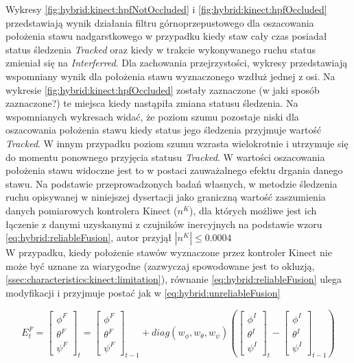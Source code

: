 Wykresy \ref{fig:hybrid:kinect:hpfNotOccluded} i \ref{fig:hybrid:kinect:hpfOccluded} przedstawiają wynik działania filtru górnoprzepustowego dla oszacowania położenia stawu nadgarstkowego w przypadku kiedy staw cały czas posiadał status śledzenia \emph{Tracked} oraz kiedy w trakcie wykonywanego ruchu status zmieniał się na \emph{Interferred}. Dla zachowania przejrzystości, wykresy przedstawiają wspomniany wynik dla położenia stawu wyznaczonego wzdłuż jednej z osi. Na wykresie \ref{fig:hybrid:kinect:hpfOccluded} zostały zaznaczone (w jaki sposób zaznaczone?) te miejsca kiedy nastąpiła zmiana statusu śledzenia. Na wspomnianych wykresach widać, że poziom szumu pozostaje niski dla oszacowania położenia stawu kiedy status jego śledzenia przyjmuje wartość \emph{Tracked}. W innym przypadku poziom szumu wzrasta wielokrotnie i utrzymuje się do momentu ponownego przyjęcia statusu  \emph{Tracked}. W wartości oszacowania położenia stawu widoczne jest to w postaci zauważalnego efektu drgania danego stawu. Na podstawie przeprowadzonych badań własnych, w metodzie śledzenia ruchu opisywanej w niniejszej dysertacji jako graniczną wartość zaszumienia danych pomiarowych kontrolera Kinect ($n^K$), dla których możliwe jest ich łączenie z danymi uzyskanymi z czujników inercyjnych na podstawie wzoru \eqref{eq:hybrid:reliableFusion}, autor przyjął $|n^K| \le 0.0004$\\

W przypadku, kiedy położenie stawów wyznaczone przez kontroler Kinect nie może być uznane za wiarygodne (zazwyczaj spowodowane jest to okluzją, \ref{ssec:characteristics:kinect:limitation}), równanie \eqref{eq:hybrid:reliableFusion} ulega modyfikacji i przyjmuje postać jak w \eqref{eq:hybrid:unreliableFusion} 

\begin{equation} 
	\label{eq:hybrid:unreliableFusion}
	E^F_t = 
	\begin{bmatrix}  \phi^F \\  \theta^F \\  \psi^F \end{bmatrix}_t = 
	\begin{bmatrix}  \phi^F \\  \theta^F \\  \psi^F \end{bmatrix}_{t-1} +
	diag(w_\phi,w_\theta,w_\psi)
	(\begin{bmatrix}  \phi^I \\  \theta^I \\  \psi^I \end{bmatrix}_t -
	\begin{bmatrix}  \phi^I \\  \theta^I \\  \psi^I \end{bmatrix}_{t-1})
\end{equation}


